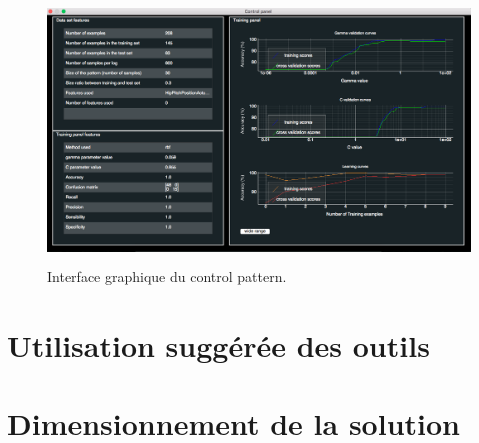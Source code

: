 \begin{figure}[h]
	\centering\includegraphics[height=7cm]{images/control_panel.png}
	\caption[Interface graphique du control pattern]{Interface graphique du control pattern.}
	\label{fig:Interface graphique du control pattern}
\end{figure}

\section{Utilisation suggérée des outils}
\label{Industrialisation du produit: Utilisation suggérée des outils}

\section{Dimensionnement de la solution}
\label{Industrialisation du produit: Dimensionnement de la solution}